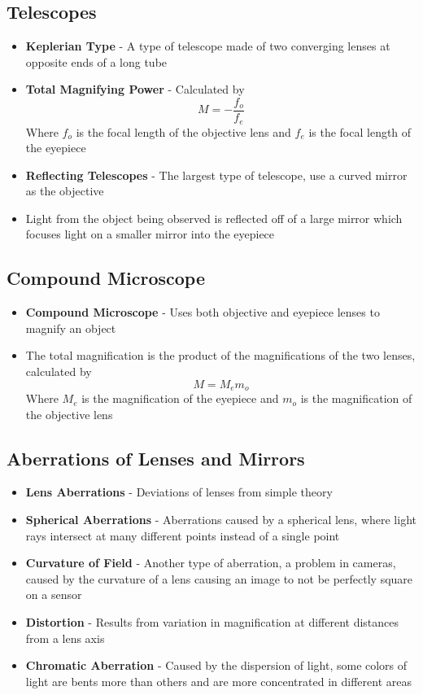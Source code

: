 \subsection{Telescopes}
\begin{itemize}
    \item \textbf{Keplerian Type} - A type of telescope made of two converging lenses at opposite ends of a long tube
    \item \textbf{Total Magnifying Power} - Calculated by \[M=-\frac{f_o}{f_e}\] Where \(f_o\) is the focal length of the objective lens and \(f_e\) is the focal length of the eyepiece
    \item \textbf{Reflecting Telescopes} - The largest type of telescope, use a curved mirror as the objective
    \item Light from the object being observed is reflected off of a large mirror which focuses light on a smaller mirror into the eyepiece
\end{itemize}

\subsection{Compound Microscope}
\begin{itemize}
    \item \textbf{Compound Microscope} - Uses both objective and eyepiece lenses to magnify an object
    \item The total magnification is the product of the magnifications of the two lenses, calculated by \[M=M_em_o\] Where \(M_e\) is the magnification of the eyepiece and \(m_o\) is the magnification of the objective lens
\end{itemize}

\subsection{Aberrations of Lenses and Mirrors}
\begin{itemize}
    \item \textbf{Lens Aberrations} - Deviations of lenses from simple theory
    \item \textbf{Spherical Aberrations} - Aberrations caused by a spherical lens, where light rays intersect at many different points instead of a single point
    \item \textbf{Curvature of Field} - Another type of aberration, a problem in cameras, caused by the curvature of a lens causing an image to not be perfectly square on a sensor
    \item \textbf{Distortion} - Results from variation in magnification at different distances from a lens axis
    \item \textbf{Chromatic Aberration} - Caused by the dispersion of light, some colors of light are bents more than others and are more concentrated in different areas
\end{itemize}

